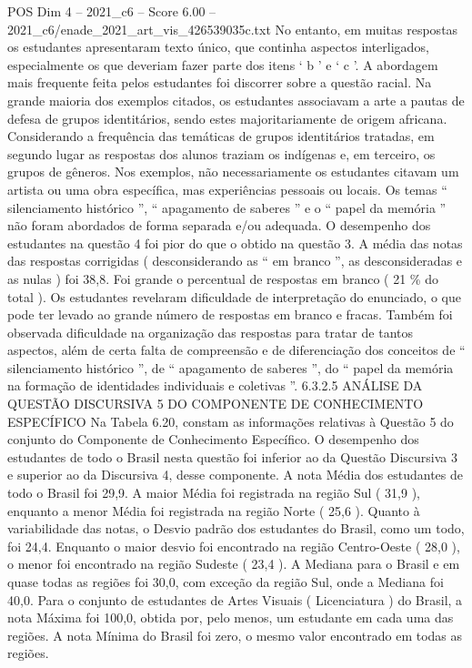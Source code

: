 \begin{textsample}{POS Dim 4 – 2021\_c6 – Score 6.00 – 2021\_c6/enade\_2021\_art\_vis\_426539035c.txt}
No entanto, em muitas respostas os estudantes apresentaram texto único, que continha aspectos interligados, especialmente os que deveriam fazer parte dos itens ‘ b ’ e ‘ c ’.
A abordagem mais frequente feita pelos estudantes foi discorrer sobre a questão racial.
Na grande maioria dos exemplos citados, os estudantes associavam a arte a pautas de defesa de grupos identitários, sendo estes majoritariamente de origem africana.
Considerando a frequência das temáticas de grupos identitários tratadas, em segundo lugar as respostas dos alunos traziam os indígenas e, em terceiro, os grupos de gêneros.
Nos exemplos, não necessariamente os estudantes citavam um artista ou uma obra específica, mas experiências pessoais ou locais.
Os temas “ silenciamento histórico ”, “ apagamento de saberes ” e o “ papel da memória ” não foram abordados de forma separada e/ou adequada.
O desempenho dos estudantes na questão 4 foi pior do que o obtido na questão 3.
A média das notas das respostas corrigidas ( desconsiderando as “ em branco ”, as desconsideradas e as nulas ) foi 38,8.
Foi grande o percentual de respostas em branco ( 21 \% do total ).
Os estudantes revelaram dificuldade de interpretação do enunciado, o que pode ter levado ao grande número de respostas em branco e fracas.
Também foi observada dificuldade na organização das respostas para tratar de tantos aspectos, além de certa falta de compreensão e de diferenciação dos conceitos de “ silenciamento histórico ”, de “ apagamento de saberes ”, do “ papel da memória na formação de identidades individuais e coletivas ”. 6.3.2.5 ANÁLISE DA QUESTÃO DISCURSIVA 5 DO COMPONENTE DE CONHECIMENTO ESPECÍFICO Na Tabela 6.20, constam as informações relativas à Questão 5 do conjunto do Componente de Conhecimento Específico.
O desempenho dos estudantes de todo o Brasil nesta questão foi inferior ao da Questão Discursiva 3 e superior ao da Discursiva 4, desse componente.
A nota Média dos estudantes de todo o Brasil foi 29,9.
A maior Média foi registrada na região Sul ( 31,9 ), enquanto a menor Média foi registrada na região Norte ( 25,6 ).
Quanto à variabilidade das notas, o Desvio padrão dos estudantes do Brasil, como um todo, foi 24,4.
Enquanto o maior desvio foi encontrado na região Centro-Oeste ( 28,0 ), o menor foi encontrado na região Sudeste ( 23,4 ).
A Mediana para o Brasil e em quase todas as regiões foi 30,0, com exceção da região Sul, onde a Mediana foi 40,0.
Para o conjunto de estudantes de Artes Visuais ( Licenciatura ) do Brasil, a nota Máxima foi 100,0, obtida por, pelo menos, um estudante em cada uma das regiões.
A nota Mínima do Brasil foi zero, o mesmo valor encontrado em todas as regiões.

\end{textsample}
